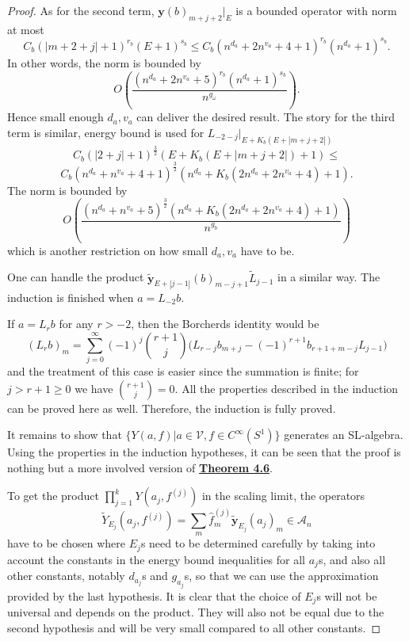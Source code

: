 \documentclass[twoside,11pt,titlepage]{amsart}
\renewcommand{\=}[1]{\stackrel{#1}{=}} %
\theoremstyle{definition}
\theoremstyle{remark}
\begin{document}
\begin{proof}
As for the second term, ${\textbf{y}}(b)_{m+j+2}|_{E}$ is a bounded operator with norm at most 
$$C_{b}(|m+2+j|+1)^{r_b}(E+1)^{s_b} \le C_{b}(n^{d_a}+2n^{v_a}+4+1)^{r_b}(n^{d_a}+1)^{s_b}.$$
In other words, the norm is bounded by
$$O(\frac{(n^{d_a}+2n^{v_a}+5)^{r_b}(n^{d_a}+1)^{s_b}}{n^{g_\omega}}).$$
Hence small enough $d_a,v_a$ can deliver the desired result.
The story for the third term is similar, energy bound is used for $L_{-2-j}|_{E+K_b(E+|m+j+2|)}$ 
$$C_{b}(|2+j|+1)^{\frac{3}{2}}(E+K_b(E+|m+j+2|)+1) \le$$
$$C_{b}(n^{d_a}+n^{v_a}+4+1)^{\frac{3}{2}}(n^{d_a}+K_b(2n^{d_a}+2n^{v_a}+4)+1).$$
The norm is bounded by
$$O(\frac{(n^{d_a}+n^{v_a}+5)^{\frac{3}{2}}(n^{d_a}+K_b(2n^{d_a}+2n^{v_a}+4)+1)}{n^{g_b}})$$
which is another restriction on how small $d_a,v_a$ have to be.

One can handle the product $\widetilde{\textbf{y}}_{E+|j-1|}(b)_{m-j+1}\widetilde{L}_{j-1}$ in a similar way. The induction is finished when $a=L_{-2}b$.

If $a=L_rb$ for any $r>-2$, then the Borcherds identity would be
$$(L_{r}b)_m=\sum\limits_{j=0}^{\infty} (-1)^j \binom{r+1}{j}\Big(L_{r-j}b_{m+j}-(-1)^{r+1}b_{r+1+m-j}L_{j-1}  \Big)$$
and the treatment of this case is easier since the summation is finite; for $j>r+1\ge0$ we have $\binom{r+1}{j}=0$. All the properties described in the induction can be proved here as well. Therefore, the induction is fully proved.

It remains to show that $\{Y(a,f) | a \in \mathcal{V}, f \in C^\infty(S^1)\}$ generates an SL-algebra. Using the properties in the induction hypotheses, it can be seen that the proof is nothing but a more involved version of \hyperref[thm4.6]{\textbf{Theorem 4.6}}.

To get the product $\prod_{j=1}^k Y(a_j,f^{(j)})$ in the scaling limit, the operators $$\widetilde{Y}_{E_j}(a_j,f^{(j)})=\sum_m \hat{f}^{(j)}_m\widetilde{\textbf{y}}_{E_j}(a_j)_m \in \mathcal{A}_n$$
have to be chosen where $E_j$s need to be determined carefully by taking into account the constants in the energy bound inequalities for all $a_j$s, and also all other constants, notably $d_{a_j}$s and $g_{a_j}$s, so that we can use the approximation provided by the last hypothesis. It is clear that the choice of $E_j$s will not be universal and depends on the product. They will also not be equal due to the second hypothesis and will be very small compared to all other constants.
\end{proof}
\end{document}
